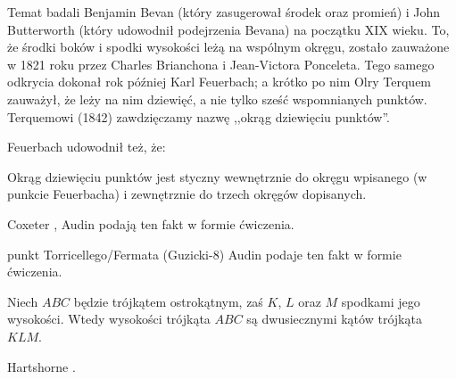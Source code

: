 Temat badali Benjamin Bevan (który zasugerował środek oraz promień) i John Butterworth (który udowodnił podejrzenia Bevana) na początku XIX wieku.
%
%
To, że środki boków i spodki wysokości leżą na wspólnym okręgu, zostało zauważone w 1821 roku przez Charles Brianchona i Jean-Victora Ponceleta.
%
%
Tego samego odkrycia dokonał rok później Karl Feuerbach; a krótko po nim Olry Terquem zauważył, że leży na nim dziewięć, a nie tylko sześć wspomnianych punktów.
%
%
Terquemowi (1842) zawdzięczamy nazwę ,,okrąg dziewięciu punktów''.

Feuerbach udowodnił też, że:

\begin{theorem}[Feuerbacha]
\label{punkt_feuerbacha}%
	Okrąg dziewięciu punktów jest styczny wewnętrznie do okręgu wpisanego (w punkcie Feuerbacha) i zewnętrznie do trzech okręgów dopisanych.
\end{theorem}

Coxeter \cite[s. 99]{coxeter_1967}, Audin \cite[s. 110]{audin_2003} podają ten fakt w formie ćwiczenia.

punkt Torricellego/Fermata (Guzicki-8)
Audin \cite[s. 105]{audin_2003} podaje ten fakt w formie ćwiczenia.

\begin{proposition}
	\label{orthic_triangle}
	Niech $ABC$ będzie trójkątem ostrokątnym, zaś $K$, $L$ oraz $M$ spodkami jego wysokości.
	Wtedy wysokości trójkąta $ABC$ są dwusiecznymi kątów trójkąta $KLM$.
\end{proposition}

Hartshorne \cite[s. 58]{hartshorne2000}.

%